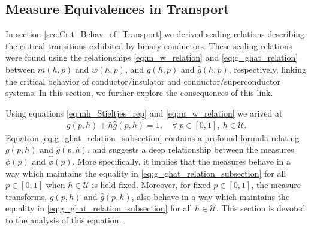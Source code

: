 \documentclass[english,12pt]{ttuthes}
\newcommand{\ph}{\hat{\phi}}
\begin{document}
\subsection{Measure Equivalences in Transport} \label{sec:Measure_Equiv}
%
In section \ref{sec:Crit_Behav_of_Transport} we derived scaling
relations describing the critical transitions exhibited by binary
conductors. These scaling relations were found using the
relationships \eqref{eq:m_w_relation} and \eqref{eq:g_ghat_relation}
between $m(h,p)$ and $w(h,p)$, and $g(h,p)$ and $\hat{g}(h,p)$,
respectively, linking the critical behavior of conductor/insulator and
conductor/superconductor systems. In this section, we further explore
the consequences of this link. 

Using equations \eqref{eq:mh_Stieltjes_rep} and
\eqref{eq:m_w_relation} we arived at 
%
\begin{align}\label{eq:g_ghat_relation_subsection}
  g(p,h)+h\hat{g}(p,h)=1, \quad \forall \ p\in[0,1], \ h\in\mathcal{U}.
\end{align}
%
Equation \eqref{eq:g_ghat_relation_subsection} contains a profound formula
relating $g(p,h)$ and $\hat{g}(p,h)$, and suggests a deep relationship
between the measures $\phi(p)$ and $\ph(p)$. More specifically, it
implies that the measures behave in a way which maintains the equality
in \eqref{eq:g_ghat_relation_subsection} for all $p\in[0,1]$ when $h\in\mathcal{U}$
is held fixed. Moreover, for fixed $p\in[0,1]$, the measure transforms,
$g(p,h)$ and $\hat{g}(p,h)$, also behave in a way which maintains the
equality in \eqref{eq:g_ghat_relation_subsection} for all $h\in\mathcal{U}$. This
section is devoted to the analysis of this equation. 
\end{document}
